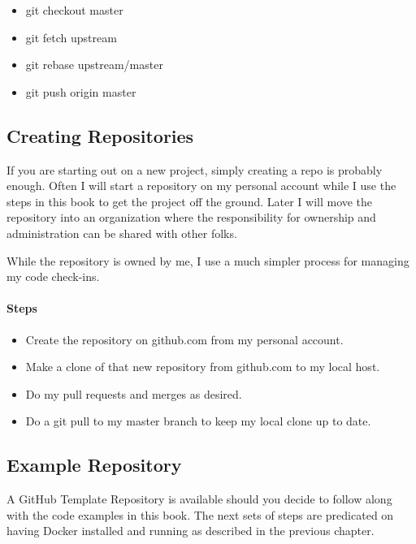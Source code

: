\begin{itemize}
      \item
            git checkout master
      \item
            git fetch upstream
      \item
            git rebase upstream/master
      \item
            git push origin master
\end{itemize}
\subsection{Creating Repositories}

\justify{}
If you are starting out on a new project, simply creating a repo is
probably enough. Often I will start a repository on my personal account
while I use the steps in this book to get the project off the ground.
Later I will move the repository into an organization where the
responsibility for ownership and administration can be shared with other
folks.

\justify{}
While the repository is owned by me, I use a much simpler process for
managing my code check-ins.

\hypertarget{steps-2}{%
      \paragraph{Steps}\label{steps-2}}

\begin{itemize}
      \item
            Create the repository on github.com from my personal account.
      \item
            Make a clone of that new repository from github.com to my local host.
      \item
            Do my pull requests and merges as desired.
      \item
            Do a git pull to my master branch to keep my local clone up to date.
\end{itemize}
\subsection{Example Repository}

\justify{}
A GitHub Template Repository is available should you decide to follow
along with the code examples in this book. The next sets of steps are
predicated on having Docker installed and running as described in the
previous chapter.

